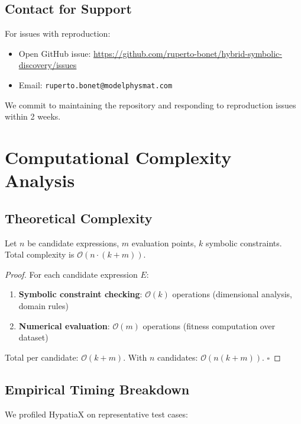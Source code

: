 \documentclass[twoside,11pt]{article}
\newcommand{\qed}{\hfill$\square$}
\begin{document}
\subsection{Contact for Support}

For issues with reproduction:
\begin{itemize}
\item Open GitHub issue: \url{https://github.com/ruperto-bonet/hybrid-symbolic-discovery/issues}
\item Email: \texttt{ruperto.bonet@modelphysmat.com}
\end{itemize}

We commit to maintaining the repository and responding to reproduction issues within 2 weeks.

\section{Computational Complexity Analysis}
\label{app:complexity}

\subsection{Theoretical Complexity}

\begin{proposition}
Let $n$ be candidate expressions, $m$ evaluation points, $k$ symbolic constraints. Total complexity is $\mathcal{O}(n \cdot (k + m))$.
\end{proposition}

\begin{proof}
For each candidate expression $E$:
\begin{enumerate}
\item \textbf{Symbolic constraint checking}: $\mathcal{O}(k)$ operations (dimensional analysis, domain rules)
\item \textbf{Numerical evaluation}: $\mathcal{O}(m)$ operations (fitness computation over dataset)
\end{enumerate}

Total per candidate: $\mathcal{O}(k + m)$. With $n$ candidates: $\mathcal{O}(n(k + m))$. \qed
\end{proof}

\subsection{Empirical Timing Breakdown}

We profiled HypatiaX on representative test cases:
\end{document}
